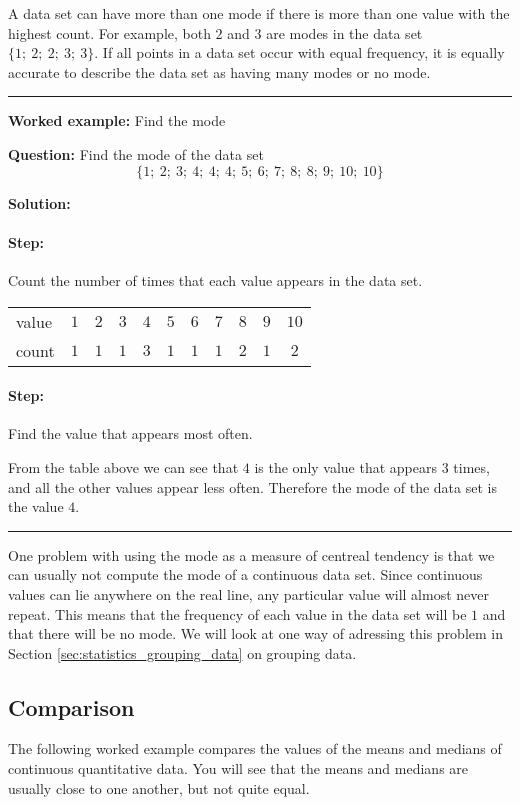 \documentclass[a4paper,11pt]{report}
\newenvironment{wex}[3]%
{\rule{\linewidth}{0.5mm}
\textbf{Worked example:} #1

\textbf{Question:} #2

\textbf{Solution:} #3}%
{\rule{\linewidth}{0.5mm}}
\newcommand{\westep}[1]{\paragraph{Step:} #1}
\begin{document}
A data set can have more than one mode if there is more than one value
with the highest count. For example, both $2$ and $3$ are modes in the
data set $\{1;\ 2;\ 2;\ 3;\ 3\}$. If all points in a data set occur
with equal frequency, it is equally accurate to describe the data set
as having many modes or no mode.

\begin{wex}{Find the mode}{
    Find the mode of the data set
    \begin{equation}
      \{1;\ 2;\ 3;\ 4;\ 4;\ 4;\ 5;\ 6;\ 7;\ 8;\ 8;\ 9;\ 10;\ 10\}
    \end{equation}
}{
  \westep{Count the number of times that each value appears in the data
    set.}
  \begin{center}
    \begin{tabular}{lcccccccccc}
      \toprule
      value & $1$ & $2$ & $3$ & $4$ & $5$ & $6$ & $7$ & $8$ & $9$ & $10$ \\
      count & $1$ & $1$ & $1$ & $3$ & $1$ & $1$ & $1$ & $2$ & $1$ & $2$  \\
      \bottomrule
    \end{tabular}
  \end{center}

  \westep{Find the value that appears most often.}

  From the table above we can see that $4$ is the only value that
  appears $3$ times, and all the other values appear less
  often. Therefore the mode of the data set is the value $4$.

}
\end{wex}

One problem with using the mode as a measure of centreal tendency is
that we can usually not compute the mode of a continuous data
set. Since continuous values can lie anywhere on the real line, any
particular value will almost never repeat. This means that the
frequency of each value in the data set will be $1$ and that there will
be no mode. We will look at one way of adressing this problem in
Section \ref{sec:statistics_grouping_data} on grouping data.

\subsection{Comparison}
The following worked example compares the values of the means and
medians of continuous quantitative data. You will see that the means
and medians are usually close to one another, but not quite equal.
\end{document}
